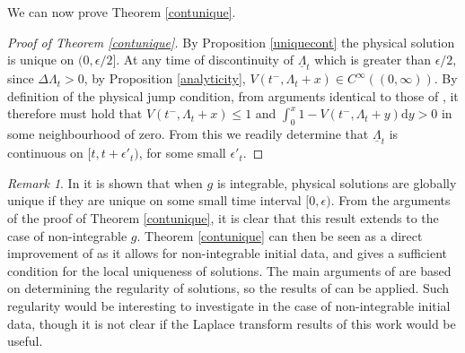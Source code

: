 \documentclass[11pt]{article}
\theoremstyle{plain}
\theoremstyle{remark}
\newtheorem{remark}[theorem]{Remark}
\theoremstyle{definition}
\numberwithin{equation}{section}
\begin{document}
We can now prove Theorem \ref{contunique}.
\begin{proof}[Proof of Theorem \ref{contunique}]
By Proposition \ref{uniquecont} the physical solution is unique on $(0,\epsilon/2]$.
At any time of discontinuity of $\underline{\Lambda}_t$ which is greater than $\epsilon/2$, since $\Delta\Lambda_t>0$, by Proposition \ref{analyticity}, $V(t^-,\Lambda_t+x)\in C^\infty((0,\infty))$. By definition of the physical jump condition, from arguments identical to those of \cite[Theorem 3.3]{5}, it therefore must hold that $V(t^-,\Lambda_t+x)\leq 1$ and $\int_0^x1-V(t^-,\Lambda_t+y)\textrm{d}y>0$ in some neighbourhood of zero. From this we readily determine that $\underline{\Lambda}_t$ is continuous on $[t,t+\epsilon'_t)$, for some small $\epsilon'_t$.
\end{proof}
\begin{remark}
    In \cite[Theorem 1.7]{munoz2026freeboundaryregularitywellposedness} it is shown that when $g$ is integrable, physical solutions are globally unique if they are unique on some small time interval $[0,\epsilon)$. From the arguments of the proof of Theorem \ref{contunique}, it is clear that this result extends to the case of non-integrable $g$. Theorem \ref{contunique} can then be seen as a direct improvement of \cite[Theorem 1.7]{munoz2026freeboundaryregularitywellposedness} as it allows for non-integrable initial data, and gives a sufficient condition for the local uniqueness of solutions.
    The main arguments of \cite{munoz2026freeboundaryregularitywellposedness} are based on determining the regularity of solutions, so the results of \cite{3} can be applied. Such regularity would be interesting to investigate in the case of non-integrable initial data, though it is not clear if the Laplace transform results of this work would be useful.
\end{remark}
\end{document}
